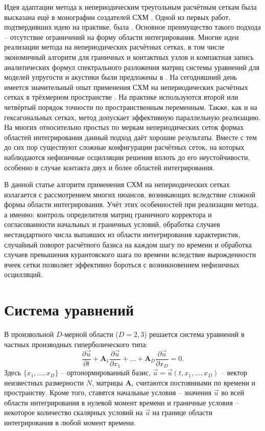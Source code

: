 \documentclass[a4paper]{article}
\numberwithin{equation}{section}
\begin{document}
Идея адаптации метода к непериодическим треугольным расчётным сеткам была 
высказана ещё в монографии создателей СХМ \cite{magomedov_kholodov_1988}. 
Одной из первых работ, подтвердивших идею на практике, была \cite{chelnokov_agapov}. 
Основное преимущество такого подхода -- отсутствие ограничений на форму области интегрирования. 
Многие идеи реализации метода на непериодических расчётных сетках, в том числе 
экономичный алгоритм для граничных и контактных узлов и 
компактная запись аналитических формул спектрального разложения 
матриц системы уравнений для моделей упругости и акустики были предложены в \cite{chelnokov}. 
На сегодняшний день имеется значительный опыт применения СХМ 
на непериодических расчётных сетках в трёхмерном пространстве 
\cite{vassilevski_15, favorskaya_tetr}. На практике используются второй или четвёртый 
порядок точности по пространственным переменным. Также, как и на гексагональных 
сетках, метод допускает эффективную параллельную реализацию. 
На многих относительно простых по меркам непериодических сеток формах областей 
интегрирования данный подход даёт хорошие результаты. 
Вместе с тем до сих пор существуют сложные конфигурации расчётных сеток, на 
которых наблюдаются нефизичные осцилляции решения вплоть до его неустойчивости, 
особенно в случае контакта двух и более областей интегрирования. 

В данной статье алгоритм применения СХМ на непериодических сетках излагается 
с рассмотрением многих нюансов, возникающих вследствие сложной формы области 
интегрирования. Учёт этих особенностей при реализации метода, а именно: 
контроль определителя матриц граничного корректора и согласованности начальных и граничных условий,
обработка случаев нестандартного числа выпавших из области интегрирования характеристик, 
случайный поворот расчётного базиса на каждом шагу по времени и 
обработка случаев превышения курантовского шага по времени вследствие вырожденности ячеек сетки 
позволяет эффективно бороться с возникновением нефизичных осцилляций. 


\section{Система уравнений}
В произвольной $D$-мерной области ($D = 2, 3$) решается система уравнений 
в частных производных гиперболического типа:
\begin{equation}
\label{general_equation}
	\frac{\partial\vec{u}}{\partial{t}}+
	\mathbf{A}_1\frac{\partial\vec{u}}{\partial{x_1}}+...+
	\mathbf{A}_D\frac{\partial\vec{u}}{\partial{x_D}}=0.
\end{equation}
Здесь $\{x_1, ..., x_D\}$ -- ортонормированный базис, 
$\vec{u} = \vec{u}(t, x_1, ..., x_D)$ -- вектор неизвестных размерности $N$,
матрицы $\mathbf{A}_i$ считаются постоянными по времени и пространству.
Кроме того, ставятся начальные условия -- значения $\vec{u}$ 
во всей области интегрирования в нулевой момент времени и
граничные условия -- некоторое количество скалярных условий на $\vec{u}$ 
на границе области интегрирования в любой момент времени.
\end{document}
